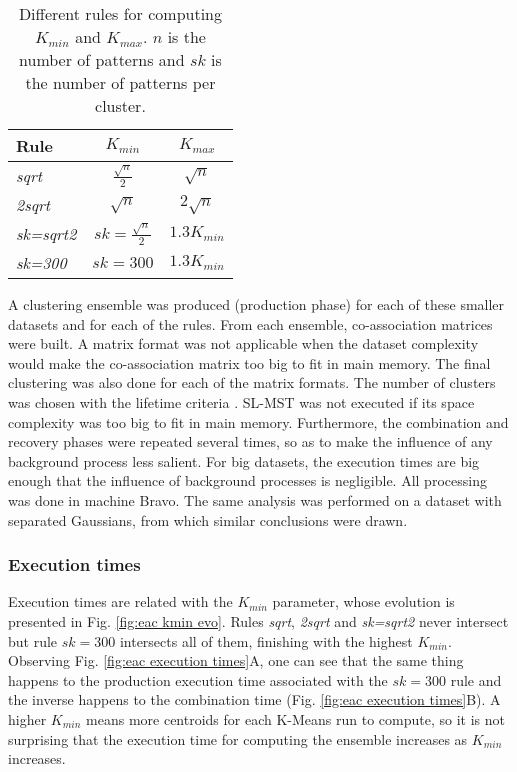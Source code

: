 \begin{table}[h]
\centering
\caption{Different rules for computing $K_{min}$ and $K_{max}$. $n$ is the number of patterns and $sk$ is the number of patterns per cluster.}

\begin{tabular}{lcc}
\toprule
Rule &  $K_{min}$ &  $K_{max}$ \\
\midrule
\emph{sqrt}     & $\frac{\sqrt{n}}{2}$      & $\sqrt{n}$    \\
\emph{2sqrt}    & $\sqrt{n}$                & $2 \sqrt{n}$  \\
\emph{sk=sqrt2} & $sk = \frac{\sqrt{n}}{2}$ & $1.3 K_{min}$ \\
\emph{sk=300}   & $sk = 300$                & $1.3 K_{min}$ \\
\bottomrule
\end{tabular}

\label{tab:eac rules}
\end{table}

A clustering ensemble was produced (production phase) for each of these smaller datasets and for each of the rules. %
From each ensemble, co-association matrices were built.
A matrix format was not applicable when the dataset complexity would make the co-association matrix too big to fit in main memory.
The final clustering was also done for each of the matrix formats. %
The number of clusters was chosen with the lifetime criteria \cite{Fred2005}.
SL-MST was not executed if its space complexity was too big to fit in main memory. %
Furthermore, the combination and recovery phases were repeated several times, so as to make the influence of any background process less salient. %
For big datasets, the execution times are big enough that the influence of background processes is negligible. %
All processing was done in machine Bravo. %
The same analysis was performed on a dataset with separated Gaussians, from which similar conclusions were drawn. %

\subsubsection{Execution times}

\noindent Execution times are related with the $K_{min}$ parameter, whose evolution is presented in Fig. \ref{fig:eac kmin evo}.
Rules \emph{sqrt}, \emph{2sqrt} and \emph{sk=sqrt2} never intersect but rule $sk=300$ intersects all of them, finishing with the highest $K_{min}$.
Observing Fig. \ref{fig:eac execution times}A, one can see that the same thing happens to the production execution time associated with the $sk=300$ rule and the inverse happens to the combination time (Fig. \ref{fig:eac execution times}B).
A higher $K_{min}$ means more centroids for each K-Means run to compute, so it is not surprising that the execution time for computing the ensemble increases as $K_{min}$ increases.

